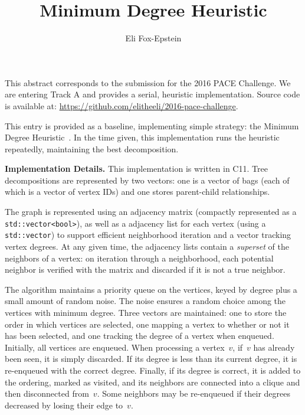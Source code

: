 \documentclass{article}
\title{Minimum Degree Heuristic}
\author{Eli Fox-Epstein}
\newcommand{\CC}{C\nolinebreak\hspace{-.05em}\raisebox{.4ex}{\tiny\bf +}\nolinebreak\hspace{-.10em}\raisebox{.4ex}{\tiny\bf +}}
\begin{document}
\maketitle

This abstract corresponds to the submission for the 2016 PACE Challenge. We are
entering Track A and provides a serial, heuristic implementation.  Source code
is available at: \url{https://github.com/elitheeli/2016-pace-challenge}.

This entry is provided as a baseline, implementing simple strategy: the Minimum
Degree Heuristic~\cite{markowitz1957elimination}. In the time given, this
implementation runs the heuristic repeatedly, maintaining the best
decomposition.

{\bf Implementation Details.}
This implementation is written in \CC{}11. Tree decompositions are represented
by two vectors: one is a vector of bags (each of which is a vector of vertex
IDs) and one stores parent-child relationships.

The graph is represented using an adjacency matrix (compactly represented as a
{\tt std::vector<bool>}), as well as a adjacency list for each vertex (using a
{\tt std::vector}) to support efficient neighborhood iteration and a vector
tracking vertex degrees.  At any given time, the adjacency lists contain a
\emph{superset} of the neighbors of a vertex: on iteration through a
neighborhood, each potential neighbor is verified with the matrix and discarded
if it is not a true neighbor.

The algorithm maintains a priority queue on the vertices, keyed by degree plus
a small amount of random noise. The noise ensures a random choice among the
vertices with minimum degree. Three vectors are maintained: one to store the
order in which vertices are selected, one mapping a vertex to whether or not it
has been selected, and one tracking the degree of a vertex when enqueued.
Initially, all vertices are enqueued.  When processing a vertex~$v$, if~$v$ has
already been seen, it is simply discarded.  If its degree is less than its
current degree, it is re-enqueued with the correct degree.  Finally, if its
degree is correct, it is added to the ordering, marked as visited, and its
neighbors are connected into a clique and then disconnected from~$v$. Some
neighbors may be re-enqueued if their degrees decreased by losing their edge
to~$v$.



\end{document}
